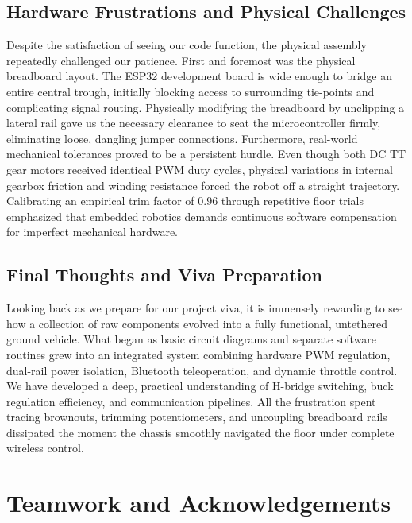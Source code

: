 \documentclass[journal,12pt,onecolumn]{IEEEtran}
\begin{document}
\subsection{Hardware Frustrations and Physical Challenges}
Despite the satisfaction of seeing our code function, the physical assembly repeatedly challenged our patience. %
First and foremost was the physical breadboard layout. %
The ESP32 development board is wide enough to bridge an entire central trough, initially blocking access to surrounding tie-points and complicating signal routing.
Physically modifying the breadboard by unclipping a lateral rail gave us the necessary clearance to seat the microcontroller firmly, eliminating loose, dangling jumper connections.
Furthermore, real-world mechanical tolerances proved to be a persistent hurdle. %
Even though both DC TT gear motors received identical PWM duty cycles, physical variations in internal gearbox friction and winding resistance forced the robot off a straight trajectory. %
Calibrating an empirical trim factor of $0.96$ through repetitive floor trials emphasized that embedded robotics demands continuous software compensation for imperfect mechanical hardware. %

\subsection{Final Thoughts and Viva Preparation}
Looking back as we prepare for our project viva, it is immensely rewarding to see how a collection of raw components evolved into a fully functional, untethered ground vehicle. %
What began as basic circuit diagrams and separate software routines grew into an integrated system combining hardware PWM regulation, dual-rail power isolation, Bluetooth teleoperation, and dynamic throttle control. %
We have developed a deep, practical understanding of H-bridge switching, buck regulation efficiency, and communication pipelines. %
All the frustration spent tracing brownouts, trimming potentiometers, and uncoupling breadboard rails dissipated the moment the chassis smoothly navigated the floor under complete wireless control. %

\newpage

\section{Teamwork and Acknowledgements}
\end{document}
